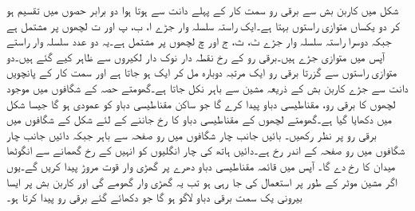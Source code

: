 شکل   میں کاربن بش سے برقی رو سمت کار کے پہلے دانت سے ہوتا ہوا دو برابر حصوں  میں تقسیم ہو کر دو یکساں متوازی راستوں بہتا ہے۔ایک راستہ سلسلہ وار جڑے ا، ب، پ اور ت لچھوں پر مشتمل ہے جبکہ دوسرا راستہ سلسلہ وار جڑے ٹ، ث، ج اور چ لچھوں پر مشتمل  ہے۔یہ دو عدد سلسلہ وار راستے آپس میں متوازی جڑے ہیں۔برقی رو کے رخ نقطہ دار نوک دار لکیروں سے ظاہر کیے گئے ہیں۔دو متوازی راستوں سے گزرتا برقی رو ایک مرتبہ دوبارہ مل کر ایک ہو جاتا ہے اور سمت کار کے پانچویں دانت سے جڑے کاربن بش کے ذریعہ مشین سے باہر نکل جاتا ہے۔گھومتے حصہ کے شگافوں میں موجود لچھوں کا برقی رو،  مقناطیسی دباو پیدا کرے گا جو ساکن مقناطیسی دباو کو عمودی ہو گا جیسا شکل   میں دکھایا گیا ہے۔گھومتے لچھوں کے مقناطیسی دباو کا  رخ جاننے  کے لئے
 شکل  کے  شگافوں  میں برقی رو پر نظر رکھیں۔ بائیں جانب چار شگافوں میں رو صفحہ سے باہر جبکہ دائیں جانب چار شگافوں میں رو صفحہ کے اندر رخ ہے۔دائیں ہاتھ کی چار انگلیوں کو انہیں کے رخ گھمانے سے انگوٹھا میدان کا رخ دے گا۔ آپس میں قائمہ مقناطیسی دباو دھرے پر گھڑی وار قوت مروڑ پیدا کریں گے۔یوں اگر مشین موٹر کے طور پر استعمال کی جا رہی ہو تب یہ گھڑی وار گھومے گی اور کاربن بش پر ایسا بیرونی یک سمت  برقی دباو لاگو ہو گا جو دکھائے گئے برقی رو پیدا کرتا ہو۔
